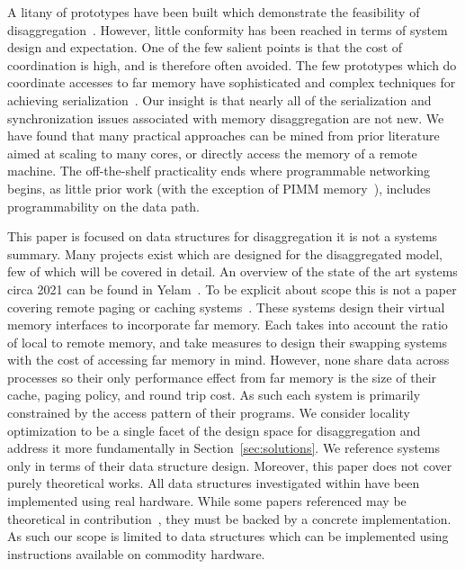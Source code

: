 A litany of prototypes have been built which demonstrate the feasibility of
disaggregation~\cite{infiniswap,fastswap,leap,legoos,aifm,kona,reigons,software-far,lite,semeru}.
However, little conformity has been reached in terms of system design and
expectation. One of the few salient points is that the cost of coordination is
high, and is therefore often avoided. The few prototypes which do coordinate
accesses to far memory have sophisticated and complex techniques for achieving
serialization~\cite{clover,one-sided-hash,sherman,ford}. Our insight is that
nearly all of the serialization and synchronization issues associated with
memory disaggregation are not new. We have found that many practical approaches
can be mined from prior literature aimed at scaling to many cores, or directly
access the memory of a remote machine. The off-the-shelf practicality ends where
programmable networking begins, as little prior work (with the exception of PIMM
memory~\cite{near-memory-structs}), includes programmability on the data path.

This paper is focused on data structures for disaggregation it is not a systems
summary.  Many projects exist which are designed for the disaggregated model,
few of which will be covered in detail. An overview of the state of the art
systems circa 2021 can be found in Yelam~\cite{yelam2022systems}.
To be explicit about scope this is not a paper covering remote paging or caching
systems~\cite{fastswap,kona,infiniswap,leap,legoos}. These systems design their
virtual memory interfaces to incorporate far memory. Each takes into account the
ratio of local to remote memory, and take measures to design their swapping
systems with the cost of accessing far memory in mind.  However, none share data
across processes so their only performance effect from far memory is the size of
their cache, paging policy, and round trip cost. As such each system is
primarily constrained by the access pattern of their programs. We consider
locality optimization to be a single facet of the design space for
disaggregation and address it more fundamentally in Section~\ref{sec:solutions}.
We reference systems only in terms of their data structure design.
Moreover, this paper does not cover purely theoretical works. All data
structures investigated within have been implemented using real hardware. While
some papers referenced may be theoretical in
contribution~\cite{flat-combine,hopscotch,linked-list-cas}, they must be backed
by a concrete implementation. As such our scope is limited to data structures
which can be implemented using instructions available on commodity hardware.

